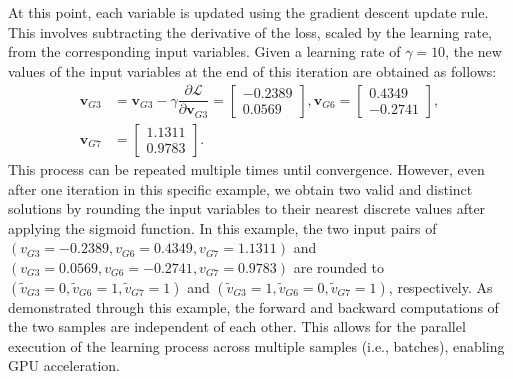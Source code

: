 At this point, each variable is updated using the gradient descent update rule. This involves subtracting the derivative of the loss, scaled by the learning rate, from the corresponding input variables. Given a learning rate of $\gamma = 10$, the new values of the input variables at the end of this iteration are obtained as follows:
\begin{align}
    \textbf{v}_{G3} &= \textbf{v}_{G3} - \gamma \dfrac{\partial \mathcal{L}}{\partial \textbf{v}_{G3}} =  \begin{bmatrix}
           -0.2389 \\
           0.0569
         \end{bmatrix}, \textbf{v}_{G6} = \begin{bmatrix}
           0.4349 \\
           -0.2741
         \end{bmatrix}, \nonumber \\ \textbf{v}_{G7} & = \begin{bmatrix}
           1.1311 \\
           0.9783
         \end{bmatrix}.
\end{align}
This process can be repeated multiple times until convergence. However, even after one iteration in this specific example, we obtain two valid and distinct solutions by rounding the input variables to their nearest discrete values after applying the sigmoid function. In this example, the two input pairs of $(v_{G3} = -0.2389, v_{G6} = 0.4349, v_{G7} = 1.1311)$ and $(v_{G3} = 0.0569, v_{G6} = -0.2741, v_{G7} = 0.9783)$ are rounded to $(\widetilde{v}_{G3} = 0, \widetilde{v}_{G6} = 1, \widetilde{v}_{G7} = 1)$ and $(\widetilde{v}_{G3} = 1, \widetilde{v}_{G6} = 0, \widetilde{v}_{G7} = 1)$, respectively. As demonstrated through this example, the forward and backward computations of the two samples are independent of each other. This allows for the parallel execution of the learning process across multiple samples (i.e., batches), enabling GPU acceleration.


%          
%          



